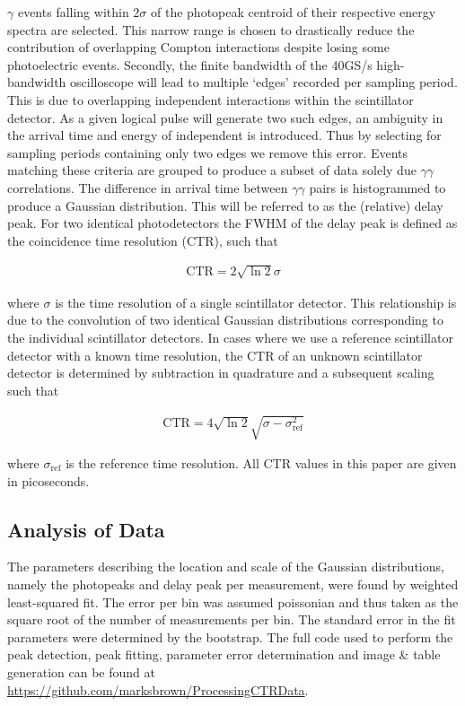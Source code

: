 $\gamma$ events falling within $2\sigma$ of the photopeak centroid of their respective energy spectra are selected. This narrow range is chosen to drastically reduce the contribution of overlapping Compton interactions despite losing some photoelectric events. Secondly, the finite bandwidth of the 40GS/s high-bandwidth oscilloscope will lead to multiple `edges' recorded per sampling period. This is due to overlapping independent interactions within the scintillator detector. As a given logical pulse will generate two such edges, an ambiguity in the arrival time and energy of independent is introduced. Thus by selecting for sampling periods containing only two edges we remove this error. Events matching these criteria are grouped to produce a subset of data solely due $\gamma\gamma$ correlations. The difference in arrival time between $\gamma\gamma$ pairs is histogrammed to produce a Gaussian distribution. This will be referred to as the (relative) delay peak. For two identical photodetectors the FWHM of the delay peak is defined as the coincidence time resolution (CTR), such that

\begin{align}
\text{CTR} = 2\sqrt{\ln{2}}\sigma
\end{align}

where $\sigma$ is the time resolution of a single scintillator detector. This relationship is due to the convolution of two identical Gaussian distributions corresponding to the individual scintillator detectors. In cases where we use a reference scintillator detector with a known time resolution, the CTR of an unknown scintillator detector is determined by subtraction in quadrature and a subsequent scaling such that

\begin{align}
\text{CTR} = 4\sqrt{\ln{2}}\sqrt{\sigma-\sigma_\textrm{ref}^2}
\end{align}

where $\sigma_\text{ref}$ is the reference time resolution. All CTR values in this paper are given in picoseconds.

\subsection{Analysis of Data}
The parameters describing the location and scale of the Gaussian distributions, namely the photopeaks and delay peak per measurement, were found by weighted least-squared fit. The error per bin was assumed poissonian and thus taken as the square root of the number of measurements per bin. The standard error in the fit parameters were determined by the bootstrap\cite{degroot2012probability}. The full code used to perform the peak detection, peak fitting, parameter error determination and image \& table generation can be found at \href{https://github.com/marksbrown/ProcessingCTRData}{https://github.com/marksbrown/ProcessingCTRData}.
